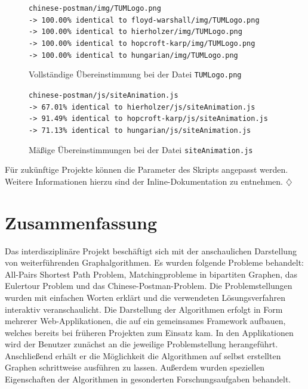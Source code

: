 \begin{figure}[h!]
\noindent\texttt{chinese-postman/img/TUMLogo.png \\
-> 100.00\% identical to floyd-warshall/img/TUMLogo.png \\
-> 100.00\% identical to hierholzer/img/TUMLogo.png \\
-> 100.00\% identical to hopcroft-karp/img/TUMLogo.png \\
-> 100.00\% identical to hungarian/img/TUMLogo.png
}
\caption[Gemeinsame Dateien: Beispiel 1]{Vollständige Übereinstimmung bei der Datei \texttt{TUMLogo.png}}\label{fig:shared-files-1}
\end{figure}

\begin{figure}[h!]
\noindent\texttt{chinese-postman/js/siteAnimation.js \\
-> 67.01\% identical to hierholzer/js/siteAnimation.js \\
-> 91.49\% identical to hopcroft-karp/js/siteAnimation.js \\
-> 71.13\% identical to hungarian/js/siteAnimation.js
}
\caption[Gemeinsame Dateien: Beispiel 2]{Mäßige Übereinstimmungen bei der Datei \texttt{siteAnimation.js}}\label{fig:shared-files-2}
\end{figure}

Für zukünftige Projekte können die Parameter des Skripts angepasst werden. Weitere Informationen hierzu sind der Inline-Dokumentation zu entnehmen. \hfill$\diamondsuit$

\chapter{Zusammenfassung} %
Das interdisziplinäre Projekt beschäftigt sich mit der anschaulichen Darstellung von weiterführenden Graphalgorithmen. Es wurden folgende Probleme behandelt: All-Pairs Shortest Path Problem, Matchingprobleme in bipartiten Graphen, das Eulertour Problem und das Chinese-Postman-Problem. 
Die Problemstellungen wurden mit einfachen Worten erklärt und die verwendeten Lösungsverfahren interaktiv veranschaulicht. Die Darstellung der Algorithmen erfolgt in Form mehrerer Web-Applikationen, die auf ein gemeinsames Framework aufbauen, welches bereits bei früheren Projekten zum Einsatz kam. In den Applikationen wird der Benutzer zunächst an die jeweilige Problemstellung herangeführt. Anschließend erhält er die Möglichkeit die Algorithmen auf selbst erstellten Graphen schrittweise ausführen zu lassen. Außerdem wurden speziellen Eigenschaften der Algorithmen in gesonderten Forschungsaufgaben behandelt. 

